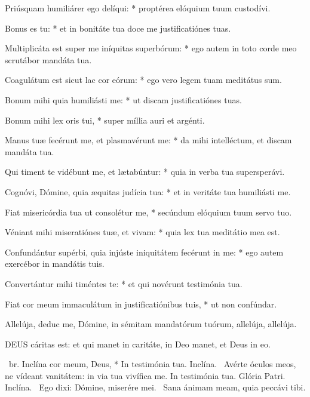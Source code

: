 Priúsquam humiliárer ego delíqui: * proptérea elóquium tuum custodívi.

Bonus es tu: * et in bonitáte tua doce me justificatiónes tuas.

Multiplicáta est super me iníquitas superbórum: * ego autem in toto corde meo scrutábor mandáta tua.

Coagulátum est sicut lac cor eórum: * ego vero legem tuam meditátus sum.

Bonum mihi quia humiliásti me: * ut discam justificatiónes tuas.

Bonum mihi lex oris tui, * super míllia auri et argénti.

Manus tuæ fecérunt me, et plasmavérunt me: * da mihi intelléctum, et discam mandáta tua.

Qui timent te vidébunt me, et lætabúntur: * quia in verba tua supersperávi.

Cognóvi, Dómine, quia æquitas judícia tua: * et in veritáte tua humiliásti me.

Fiat misericórdia tua ut consolétur me, * secúndum elóquium tuum servo tuo.

Véniant mihi miseratiónes tuæ, et vivam: * quia lex tua meditátio mea est.

Confundántur supérbi, quia injúste iniquitátem fecérunt in me: * ego autem exercébor in mandátis tuis.

Convertántur mihi timéntes te: * et qui novérunt testimónia tua.

Fiat cor meum immaculátum in justificatiónibus tuis, * ut non confúndar.

 Allelúja, deduc me, Dómine, in sémitam mandatórum tuórum, allelúja, allelúja.


\lettrine[lines=2]{D}{EUS} cáritas est: et qui manet in caritáte, in Deo manet, et Deus in eo.

\R\ br. Inclína cor meum, Deus, * In testimónia tua. Inclína. \V\ Avérte óculos meos, ne vídeant vanitátem: in via tua vivífica me. In testimónia tua. Glória Patri. Inclína. \V\ Ego dixi: Dómine, miserére mei. \R\ Sana ánimam meam, quia peccávi tibi.


